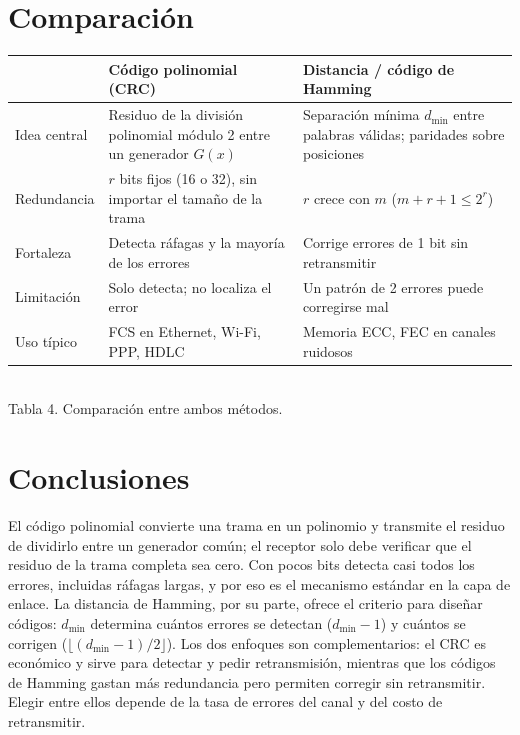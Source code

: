 \documentclass[12pt,letterpaper]{article}
\begin{document}
\section{Comparación}
\begin{center}
\small
\renewcommand{\arraystretch}{1.2}
\begin{tabular}{|>{\raggedright\arraybackslash}p{3cm}|>{\raggedright\arraybackslash}p{5.6cm}|>{\raggedright\arraybackslash}p{5.6cm}|}
\hline
 & \textbf{Código polinomial (CRC)} & \textbf{Distancia / código de Hamming}\\
\hline
Idea central & Residuo de la división polinomial módulo 2 entre un generador $G(x)$ & Separación mínima $d_{\min}$ entre palabras válidas; paridades sobre posiciones\\
\hline
Redundancia & $r$ bits fijos (16 o 32), sin importar el tamaño de la trama & $r$ crece con $m$ ($m + r + 1 \le 2^r$)\\
\hline
Fortaleza & Detecta ráfagas y la mayoría de los errores & Corrige errores de 1 bit sin retransmitir\\
\hline
Limitación & Solo detecta; no localiza el error & Un patrón de 2 errores puede corregirse mal\\
\hline
Uso típico & FCS en Ethernet, Wi-Fi, PPP, HDLC & Memoria ECC, FEC en canales ruidosos\\
\hline
\end{tabular}\\[3pt]
{\footnotesize Tabla 4. Comparación entre ambos métodos.}
\end{center}

\section{Conclusiones}
El código polinomial convierte una trama en un polinomio y transmite el residuo de dividirlo entre un generador común; el receptor solo debe verificar que el residuo de la trama completa sea cero. Con pocos bits detecta casi todos los errores, incluidas ráfagas largas, y por eso es el mecanismo estándar en la capa de enlace. La distancia de Hamming, por su parte, ofrece el criterio para diseñar códigos: $d_{\min}$ determina cuántos errores se detectan ($d_{\min}-1$) y cuántos se corrigen ($\lfloor (d_{\min}-1)/2 \rfloor$). Los dos enfoques son complementarios: el CRC es económico y sirve para detectar y pedir retransmisión, mientras que los códigos de Hamming gastan más redundancia pero permiten corregir sin retransmitir. Elegir entre ellos depende de la tasa de errores del canal y del costo de retransmitir.
\end{document}
